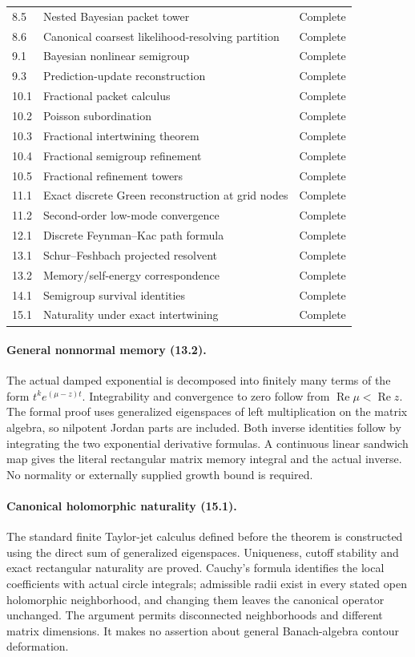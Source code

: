 \documentclass[11pt,letterpaper]{article}
\theoremstyle{plain}
\theoremstyle{plain}
\theoremstyle{plain}
\theoremstyle{definition}
\theoremstyle{definition}
\theoremstyle{definition}
\theoremstyle{definition}
\theoremstyle{definition}
\theoremstyle{remark}
\theoremstyle{remark}
\theoremstyle{remark}
\theoremstyle{remark}
\theoremstyle{remark}
\theoremstyle{remark}
\begin{document}
\begin{longtable}{@{}p{}p{}p{}@{}}
8.5 & Nested Bayesian packet tower & Complete\\
8.6 & Canonical coarsest likelihood-resolving partition & Complete\\
9.1 & Bayesian nonlinear semigroup & Complete\\
9.3 & Prediction-update reconstruction & Complete\\
10.1 & Fractional packet calculus & Complete\\
10.2 & Poisson subordination & Complete\\
10.3 & Fractional intertwining theorem & Complete\\
10.4 & Fractional semigroup refinement & Complete\\
10.5 & Fractional refinement towers & Complete\\
11.1 & Exact discrete Green reconstruction at grid nodes & Complete\\
11.2 & Second-order low-mode convergence & Complete\\
12.1 & Discrete Feynman--Kac path formula & Complete\\
13.1 & Schur--Feshbach projected resolvent & Complete\\
13.2 & Memory/self-energy correspondence & Complete\\
14.1 & Semigroup survival identities & Complete\\
15.1 & Naturality under exact intertwining & Complete\\
\end{longtable}
\normalsize

\paragraph{General nonnormal memory (13.2).}
The actual damped exponential is decomposed into finitely many terms of the form
$t^k e^{(\mu-z)t}$. Integrability and convergence to zero follow from
$\operatorname{Re}\mu<\operatorname{Re}z$. The formal proof uses generalized
eigenspaces of left multiplication on the matrix algebra, so nilpotent Jordan
parts are included. Both inverse identities follow by integrating the two
exponential derivative formulas. A continuous linear sandwich map gives the
literal rectangular matrix memory integral and the actual inverse. No normality
or externally supplied growth bound is required.

\paragraph{Canonical holomorphic naturality (15.1).}
The standard finite Taylor-jet calculus defined before the theorem is constructed
using the direct sum of generalized eigenspaces. Uniqueness, cutoff stability and
exact rectangular naturality are proved. Cauchy's formula identifies the local
coefficients with actual circle integrals; admissible radii exist in every stated
open holomorphic neighborhood, and changing them leaves the canonical operator
unchanged. The argument permits disconnected neighborhoods and different matrix
dimensions. It makes no assertion about general Banach-algebra contour deformation.
\end{document}

